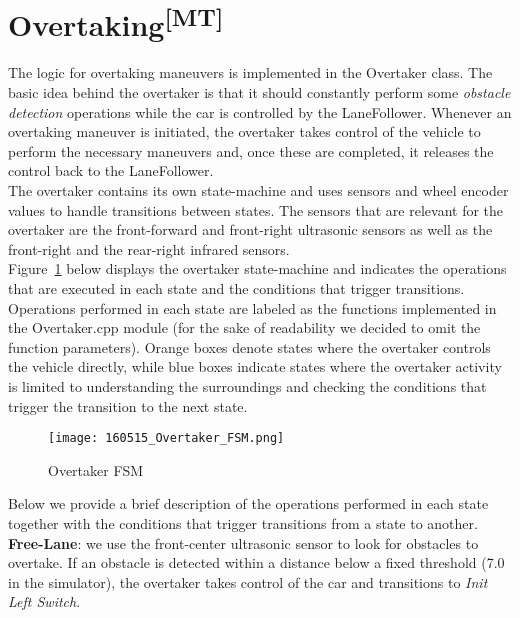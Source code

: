\section[Overtaking]{Overtaking\textsuperscript{[MT]}}
The logic for overtaking maneuvers is implemented in the Overtaker class. The
basic idea behind the overtaker is that it should constantly perform some
\textit{obstacle detection} operations while the car is controlled by the
LaneFollower. Whenever an overtaking maneuver is initiated, the overtaker takes
control of the vehicle to perform the necessary maneuvers and, once these are
completed, it releases the control back to the LaneFollower.\\
The overtaker contains its own state-machine and uses sensors and wheel encoder
values to handle transitions between states. The sensors that are relevant for
the overtaker are the front-forward and front-right ultrasonic sensors as well
as the front-right and the rear-right infrared sensors.\\
Figure~\ref{otfsma} below displays the overtaker state-machine and indicates the
operations that are executed in each state and the conditions that trigger
transitions. Operations performed in each state are labeled as the functions
implemented in the Overtaker.cpp module (for the sake of readability we decided
to omit the function parameters). Orange boxes denote states where the overtaker
controls the vehicle directly, while blue boxes indicate states where the
overtaker activity is limited to understanding the surroundings and checking the
conditions that trigger the transition to the next state.
\begin{figure}[ht]
  \centering
  \texttt{[image: 160515\_Overtaker\_FSM.png]}
  \caption{Overtaker FSM}
  \label{otfsma}
\end{figure}
Below we provide a brief description of the operations performed in each state
together with the conditions that trigger transitions from a state to another.\\

\noindent
\textbf{Free-Lane}: we use the front-center ultrasonic sensor to look for
obstacles to overtake. If an obstacle is detected within a distance below a
fixed threshold (7.0 in the simulator), the overtaker takes control of the car
and transitions to \textit{Init Left Switch}.\\

